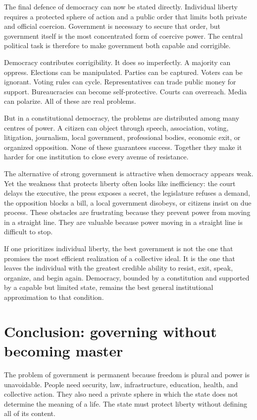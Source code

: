 ﻿\documentclass[12pt,a4paper]{book}
\begin{document}
The final defence of democracy can now be stated directly.  Individual
liberty requires a protected sphere of action and a public order that limits
both private and official coercion.  Government is necessary to secure that
order, but government itself is the most concentrated form of coercive
power.  The central political task is therefore to make government both
capable and corrigible.

Democracy contributes corrigibility.  It does so imperfectly.  A majority
can oppress.  Elections can be manipulated.  Parties can be captured.
Voters can be ignorant.  Voting rules can cycle.  Representatives can trade
public money for support.  Bureaucracies can become self-protective.  Courts
can overreach.  Media can polarize.  All of these are real problems.

But in a constitutional democracy, the problems are distributed among many
centres of power.  A citizen can object through speech, association, voting,
litigation, journalism, local government, professional bodies, economic exit,
or organized opposition.  None of these guarantees success.  Together they
make it harder for one institution to close every avenue of resistance.

The alternative of strong government is attractive when democracy appears
weak.  Yet the weakness that protects liberty often looks like inefficiency:
the court delays the executive, the press exposes a secret, the legislature
refuses a demand, the opposition blocks a bill, a local government disobeys,
or citizens insist on due process.  These obstacles are frustrating because
they prevent power from moving in a straight line.  They are valuable because
power moving in a straight line is difficult to stop.

If one prioritizes individual liberty, the best government is not the one
that promises the most efficient realization of a collective ideal.  It is
the one that leaves the individual with the greatest credible ability to
resist, exit, speak, organize, and begin again.  Democracy, bounded by a
constitution and supported by a capable but limited state, remains the best
general institutional approximation to that condition.

\clearpage
\section{Conclusion: governing without becoming master}

The problem of government is permanent because freedom is plural and power
is unavoidable.  People need security, law, infrastructure, education,
health, and collective action.  They also need a private sphere in which the
state does not determine the meaning of a life.  The state must protect
liberty without defining all of its content.
\end{document}
